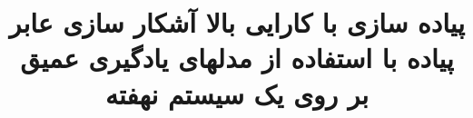 \subject{مهندسی کامپیوتر}
\title{پیاده سازی با کارایی بالا آشکار سازی عابر پیاده  با استفاده از مدلهای یادگیری عمیق بر روی  یک سیستم نهفته}












